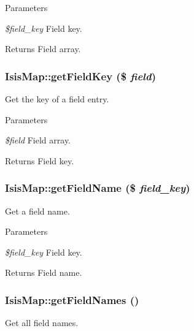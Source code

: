 \begin{DoxyParams}{Parameters}
\item[{\em \$field\_\-key}]Field key.\end{DoxyParams}
\begin{DoxyReturn}{Returns}
Field array. 
\end{DoxyReturn}
\hypertarget{classIsisMap_ac6a4eed048ddfa62c76e6d813754af81}{
\subsubsection[{getFieldKey}]{\setlength{\rightskip}{0pt plus 5cm}IsisMap::getFieldKey (\$ {\em field})}}
\label{classIsisMap_ac6a4eed048ddfa62c76e6d813754af81}
Get the key of a field entry.


\begin{DoxyParams}{Parameters}
\item[{\em \$field}]Field array.\end{DoxyParams}
\begin{DoxyReturn}{Returns}
Field key. 
\end{DoxyReturn}
\hypertarget{classIsisMap_ae41313537e399f15ff16a4db887cf5b9}{
\subsubsection[{getFieldName}]{\setlength{\rightskip}{0pt plus 5cm}IsisMap::getFieldName (\$ {\em field\_\-key})}}
\label{classIsisMap_ae41313537e399f15ff16a4db887cf5b9}
Get a field name.


\begin{DoxyParams}{Parameters}
\item[{\em \$field\_\-key}]Field key.\end{DoxyParams}
\begin{DoxyReturn}{Returns}
Field name. 
\end{DoxyReturn}
\hypertarget{classIsisMap_a157fffbdb6c533a66e3f73674bfd8ea4}{
\subsubsection[{getFieldNames}]{\setlength{\rightskip}{0pt plus 5cm}IsisMap::getFieldNames ()}}
\label{classIsisMap_a157fffbdb6c533a66e3f73674bfd8ea4}
Get all field names.

